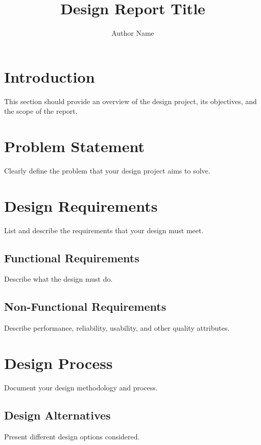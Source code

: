 \documentclass[draft]{../designreport}
\title{Design Report Title}
\author{Author Name}
\begin{document}
\maketitle

\tableofcontents
\listoffigures
\listoftables
\newpage

\section{Introduction}

This section should provide an overview of the design project, its objectives, and the scope of the report.

\section{Problem Statement}

Clearly define the problem that your design project aims to solve.

\section{Design Requirements}

List and describe the requirements that your design must meet.

\subsection{Functional Requirements}

Describe what the design must do.

\subsection{Non-Functional Requirements}

Describe performance, reliability, usability, and other quality attributes.

\section{Design Process}

Document your design methodology and process.

\subsection{Design Alternatives}

Present different design options considered.
\end{document}
